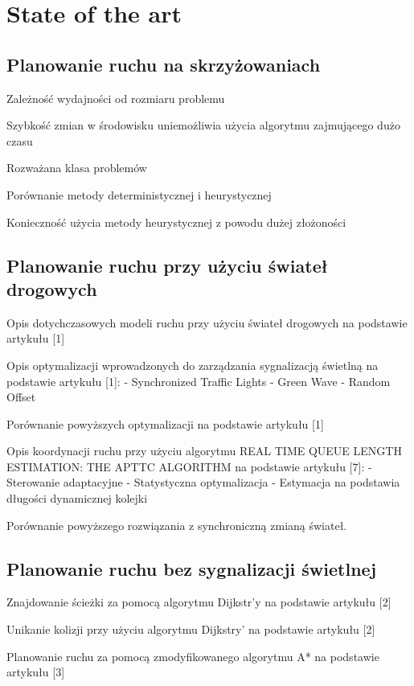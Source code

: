 \chapter{State of the art} \label{chap:state-of-the-art}

\section{Planowanie ruchu na skrzyżowaniach}

Zależność wydajności od rozmiaru problemu

Szybkość zmian w środowisku uniemożliwia użycia algorytmu zajmującego dużo czasu

Rozważana klasa problemów

Porównanie metody deterministycznej i heurystycznej

Konieczność użycia metody heurystycznej z powodu dużej złożoności

\section{Planowanie ruchu przy użyciu świateł drogowych}

Opis dotychczasowych modeli ruchu przy użyciu świateł drogowych na podstawie artykułu [1]

Opis optymalizacji wprowadzonych do zarządzania sygnalizacją świetlną na podstawie artykułu [1]:
  - Synchronized Traffic Lights
  - Green Wave
  - Random Offset

Porównanie powyższych optymalizacji na podstawie artykułu [1]

Opis koordynacji ruchu przy użyciu algorytmu REAL TIME QUEUE LENGTH ESTIMATION: THE APTTC ALGORITHM na podstawie artykułu [7]:
  - Sterowanie adaptacyjne
  - Statystyczna optymalizacja
  - Estymacja na podstawia długości dynamicznej kolejki

Porównanie powyższego rozwiązania z synchroniczną zmianą świateł.

\section{Planowanie ruchu bez sygnalizacji świetlnej}

Znajdowanie ścieżki za pomocą algorytmu Dijkstr'y na podstawie artykułu [2]

Unikanie kolizji przy użyciu algorytmu Dijkstry' na podstawie artykułu [2]

Planowanie ruchu za pomocą zmodyfikowanego algorytmu A* na podstawie artykułu [3]

